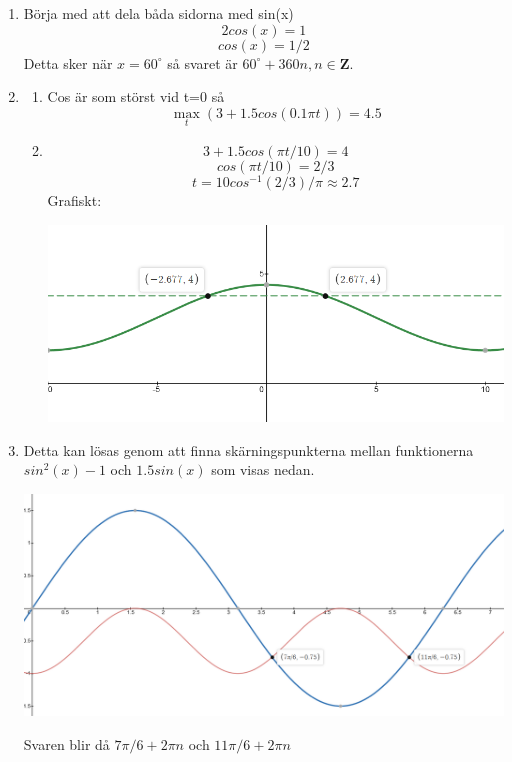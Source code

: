 \documentclass[a4paper,12pt]{article}
\begin{document}
\begin{enumerate}
      \item Börja med att dela båda sidorna med sin(x)
            $$2cos(x)=1$$
            $$cos(x)=1/2$$
            Detta sker när $x=60^\circ$ så svaret är $60^\circ + 360n, n \in \mathbf{Z}$.

      \item \begin{enumerate}
                  \item Cos är som störst vid t=0 så
                        $$\max_{t}(3+1.5cos(0.1\pi t))=4.5$$
                  \item
                        $$3+1.5cos(\pi t/10)=4$$
                        $$cos(\pi t/10)=2/3$$
                        $$t=10cos^{-1}(2/3)/\pi \approx 2.7$$
                        Grafiskt:

                        \includegraphics[scale=0.5]{Figur4.png}

            \end{enumerate}

      \item Detta kan lösas genom att finna skärningspunkterna mellan
            funktionerna $sin^2(x)-1$ och $1.5sin(x)$ som visas nedan.

            \includegraphics[scale=0.45]{Figur5.png}

            Svaren blir då $7\pi/6 +2\pi n$ och $11\pi/6 +2\pi n$


\end{enumerate}
\end{document}
